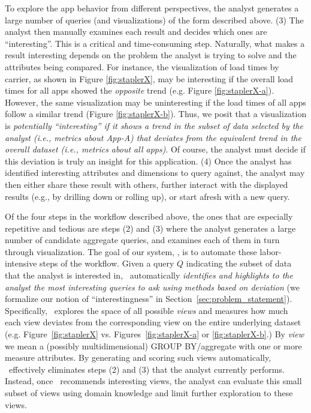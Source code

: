 To explore the app behavior from different perspectives, the analyst generates
a large number of queries (and visualizations) of the form described above.
(3) The analyst then manually examines each result and decides
which ones are ``interesting''. This is a critical and time-consuming step.
Naturally, what makes a result interesting depends on the 
problem the analyst is trying to solve and the
attributes being compared.
For instance, the visualization of load times by carrier, as shown in Figure
\ref{fig:staplerX}, may be interesting if the overall load times for all
apps showed the {\it opposite} trend (e.g. Figure \ref{fig:staplerX-a}).
However, the same visualization may be uninteresting if the load times of all apps
follow a similar trend (Figure \ref{fig:staplerX-b}).
Thus, we posit that  a visualization is {\em potentially ``interesting'' if it shows 
a trend in the subset of data selected by the analyst
(i.e., metrics about App-A)
that deviates from the equivalent trend in the overall dataset (i.e., metrics
about all apps)}.
Of course, the analyst must decide if this deviation 
is truly an insight for this application.
(4) Once the analyst has identified interesting attributes and dimensions to query
against, the analyst may
then either share these result with others, further interact with
the displayed results (e.g., by drilling down or rolling up), or
start afresh with a new query.


Of the four steps in the workflow described above, the 
ones that are especially repetitive and tedious are steps (2) and (3)
where the analyst generates a large number of candidate aggregate queries, 
and examines each
of them in turn through visualization.
The goal of our system, \VizRecDB, is to automate these
labor-intensive steps of the workflow. 
Given a query $Q$ indicating the subset
of data that the analyst is interested in, \VizRecDB\ automatically {\em
identifies and highlights to the analyst the most interesting queries to ask using methods based on
deviation} (we formalize our notion of ``interestingness'' in Section~\ref{sec:problem_statement}).
Specifically, \VizRecDB\ explores the space of all possible {\it views} and
measures how much each view deviates from the corresponding view on the
entire underlying dataset (e.g. Figure~\ref{fig:staplerX} vs.
Figures~\ref{fig:staplerX-a} or \ref{fig:staplerX-b}.) 
By {\it view} we mean a (possibly multidimensional) GROUP BY/aggregate with one or more
measure attributes.
By generating and
scoring such views automatically, \VizRecDB\ effectively eliminates
steps (2) and (3) that the analyst currently performs. 
Instead, once \VizRecDB\
recommends interesting views, the analyst can evaluate this small
subset of views using domain knowledge and limit further
exploration to these views.  

